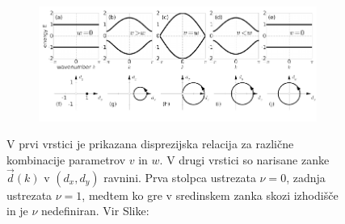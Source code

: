 \begin{figure}[H]
\centering
\begin{subfigure}{.9\textwidth}
\includegraphics[width=\linewidth]{Figures/GapAndTopology.pdf}
\end{subfigure}
\caption{V prvi vrstici je prikazana disprezijska relacija za različne kombinacije parametrov $v$ in $w$. V drugi vrstici so narisane zanke $\vec{d}(k)$ v $(d_x , d_y)$ ravnini. Prva stolpca ustrezata $\nu = 0$, zadnja ustrezata $\nu = 1$, medtem ko gre v sredinskem zanka skozi izhodišče in je $\nu$ nedefiniran. Vir Slike: \cite{madzar}}
\label{fig:examples}
\end{figure}

